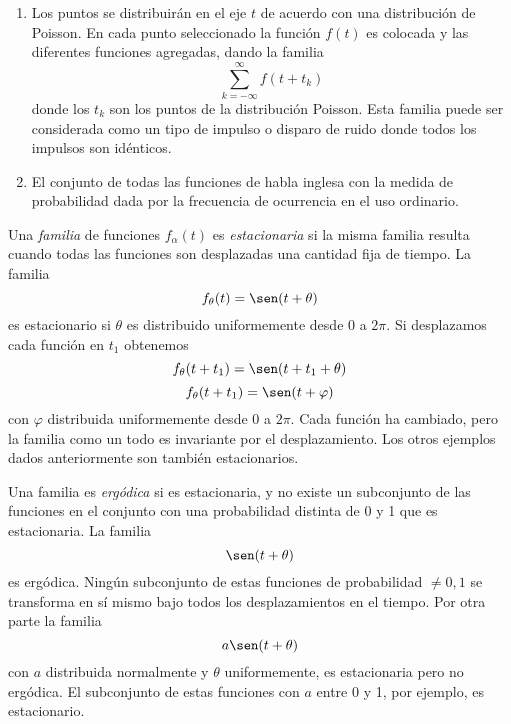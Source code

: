 \begin{enumerate}
  \item Los puntos se distribuir\'an en el eje $t$ de acuerdo con una
  distribuci\'on de Poisson. En cada punto seleccionado la funci\'on
  $f(t)$ es colocada y las diferentes funciones agregadas, dando la
  familia \begin{equation} \sum_{k=-\infty}^{\infty}
  f(t+t_k) \end{equation} donde los $t_k$ son los puntos de la
  distribuci\'on Poisson. Esta familia puede ser considerada como un
  tipo de impulso o disparo de ruido donde todos los impulsos son
  id\'enticos.

  \item El conjunto de todas las funciones de habla inglesa con la medida de
  probabilidad dada por la frecuencia de ocurrencia en el uso ordinario.
\end{enumerate}

Una {\em familia} de funciones $f_{\alpha}(t)$ es {\em estacionaria}
si la misma familia resulta cuando todas las funciones son desplazadas
una cantidad fija de tiempo. La familia
\begin{equation}
  f_{\theta}(t) = \sen(t+\theta)
\end{equation}
es estacionario si $\theta$ es distribuido uniformemente desde 0 a $2\pi$. Si
desplazamos cada funci\'on en $t_1$ obtenemos
\begin{equation}
  f_{\theta}(t+t_1) = \sen(t+t_1+\theta)
\end{equation}
\begin{equation}
  f_{\theta}(t+t_1) = \sen(t+\varphi)
\end{equation}
con $\varphi$ distribuida uniformemente desde 0 a $2\pi$. Cada funci\'on ha
cambiado, pero la familia como un todo es invariante por el desplazamiento.
Los otros ejemplos dados anteriormente son tambi\'en estacionarios.

Una familia es {\em erg\'odica} si es estacionaria, y no existe un subconjunto
de las funciones en el conjunto con una probabilidad distinta de 0 y 1 que es
estacionaria. La familia
\begin{equation}
  \sen(t+\theta)
\end{equation}
es erg\'odica. Ning\'un subconjunto de estas funciones de probabilidad
$\neq0,1$ se transforma en s\'i mismo bajo todos los desplazamientos en el
tiempo. Por otra parte la familia
\begin{equation}
  a \sen(t+\theta)
\end{equation}
con $a$ distribuida normalmente y $\theta$ uniformemente, es estacionaria pero
no erg\'odica. El subconjunto de estas funciones con $a$ entre 0 y 1, por
ejemplo, es estacionario.

